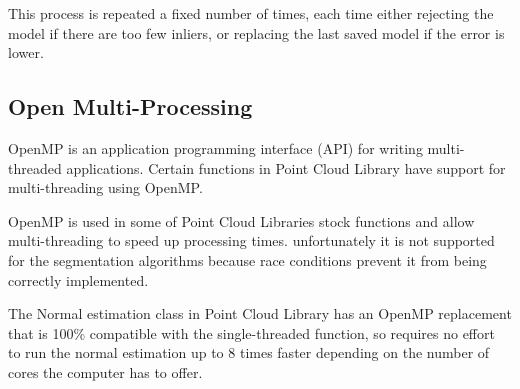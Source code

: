 		This process is repeated a fixed number of times, each time either rejecting the model if there are too few inliers, or replacing the last saved model if the error is lower.
		
	
	\subsection{Open Multi-Processing}
		OpenMP is an application programming interface (API) for writing multi-threaded applications. Certain functions in Point Cloud Library have support for multi-threading using OpenMP.
		
		OpenMP is used in some of Point Cloud Libraries stock functions and allow multi-threading to speed up processing times. unfortunately it is not supported for the segmentation algorithms because race conditions prevent it from being correctly implemented. 
		
		The Normal estimation class in Point Cloud Library has an OpenMP replacement that is 100\% compatible with the single-threaded function, so requires no effort to run the normal estimation up to 8 times faster depending on the number of cores the computer has to offer.